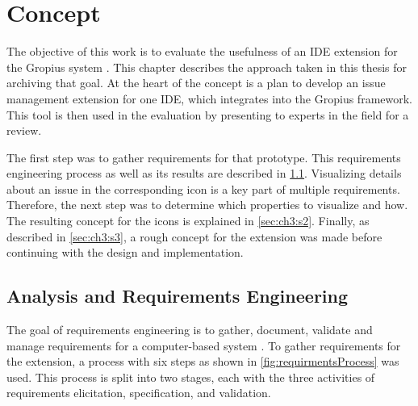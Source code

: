 
\chapter{Concept}
\label{chap:ch3}
The objective of this work is to evaluate the usefulness of an \gls{IDE} extension for the \gls{Gropius} system \cite{speth2020gropius}.
This chapter describes the approach taken in this thesis for archiving that goal.
At the heart of the concept is a plan to develop an issue management extension for one \gls{IDE},
which integrates into the  \gls{Gropius} framework.
This tool is then used in the evaluation by presenting to experts in the field for a review.

The first step was to gather requirements for that prototype. 
This requirements engineering process as well as its results are described in \cref{sec:ch3:s1}.
Visualizing details about an issue in the corresponding icon is a key part of multiple requirements.
Therefore, the next step was to determine which properties to visualize and how.
The resulting concept for the icons is explained in \cref{sec:ch3:s2}.
Finally, as described in \cref{sec:ch3:s3}, 
a rough concept for the extension was made before continuing with the design and implementation.

\section{Analysis and Requirements Engineering}
\label{sec:ch3:s1}
The goal of requirements engineering is to gather, document, validate and manage requirements for a computer-based system \cite{sommerville1997requirements}. 
To gather requirements for the extension, a process with six steps as shown in \cref{fig:requirmentsProcess} was used.
This process is split into two stages, each with the three activities of requirements elicitation, specification, and validation.

